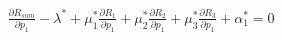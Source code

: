 \documentclass[preview]{standalone}
\begin{document}
\begin{align*}
\frac{\partial {R_{sum}}}{\partial {p_1}} - \lambda^\ast + \mu_1^\ast \frac{\partial {R_1}}{\partial {p_1}} + \mu_2^\ast \frac{\partial {R_2}}{\partial {p_1}} + \mu_3^\ast \frac{\partial {R_3}}{\partial {p_1}} + \alpha_1^\ast = 0
\end{align*}
\end{document}
